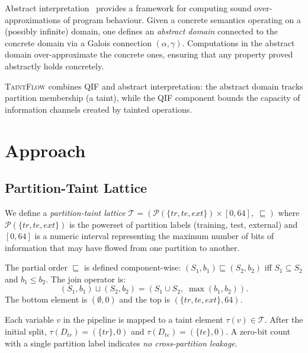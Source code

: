 \documentclass[11pt]{article}
\begin{document}
Abstract interpretation~\cite{cousot1977} provides a framework for
computing sound over-approximations of program behaviour.  Given a
concrete semantics operating on a (possibly infinite) domain, one
defines an \emph{abstract domain} connected to the concrete domain
via a Galois connection $(\alpha, \gamma)$.  Computations in the
abstract domain over-approximate the concrete ones, ensuring that any
property proved abstractly holds concretely.

\textsc{TaintFlow} combines QIF and abstract interpretation:
the abstract domain tracks partition membership (a taint), while the
QIF component bounds the capacity of information channels created by
tainted operations.

\section{Approach}\label{sec:approach}

\subsection{Partition-Taint Lattice}

We define a \emph{partition-taint lattice}
$\mathcal{T} = (\mathcal{P}(\{\mathit{tr}, \mathit{te}, \mathit{ext}\})
  \times [0, 64],\; \sqsubseteq)$
where $\mathcal{P}(\{\mathit{tr}, \mathit{te}, \mathit{ext}\})$ is
the powerset of partition labels (training, test, external) and
$[0, 64]$ is a numeric interval representing the maximum number of
bits of information that may have flowed from one partition to
another.

The partial order $\sqsubseteq$ is defined component-wise:
$(S_1, b_1) \sqsubseteq (S_2, b_2)$ iff $S_1 \subseteq S_2$ and
$b_1 \leq b_2$.  The join operator is:
\begin{equation}
  (S_1, b_1) \sqcup (S_2, b_2) = (S_1 \cup S_2,\; \max(b_1, b_2)).
\end{equation}
The bottom element is $(\emptyset, 0)$ and the top is
$(\{\mathit{tr}, \mathit{te}, \mathit{ext}\}, 64)$.

Each variable $v$ in the pipeline is mapped to a taint element
$\tau(v) \in \mathcal{T}$.  After the initial split,
$\tau(D_{\mathit{tr}}) = (\{\mathit{tr}\}, 0)$ and
$\tau(D_{\mathit{te}}) = (\{\mathit{te}\}, 0)$.  A zero-bit count
with a single partition label indicates \emph{no cross-partition
leakage}.
\end{document}
